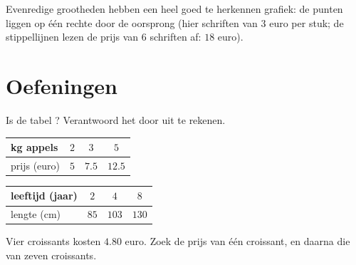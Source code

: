 \begin{omfigure}

{\small Evenredige grootheden hebben een heel goed te herkennen grafiek: de
punten liggen op één rechte  door de oorsprong (hier schriften van $3$ euro
per stuk; de stippellijnen lezen de prijs van $6$ schriften af: $18$ euro).}
\end{omfigure}

\section{Oefeningen}

\begin{exercise}[$\star$]\label{exo:g6:propdata:1}
Is de tabel ? Verantwoord het door  uit te rekenen.
\begin{center}
\renewcommand{\arraystretch}{1.2}
\begin{tabular}{l|ccc}
kg appels & $2$ & $3$ & $5$ \\
\hline
prijs (euro) & $5$ & $7.5$ & $12.5$ \\
\end{tabular}
\qquad
\begin{tabular}{l|ccc}
leeftijd (jaar) & $2$ & $4$ & $8$ \\
\hline
lengte (cm) & $85$ & $103$ & $130$ \\
\end{tabular}
\end{center}
\end{exercise}

\begin{exercise}[$\star$]\label{exo:g6:propdata:2}
Vier croissants kosten $4.80$ euro. Zoek de prijs van één croissant, en daarna
die van zeven croissants.
\end{exercise}

